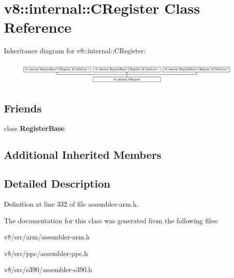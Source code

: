 \hypertarget{classv8_1_1internal_1_1CRegister}{}\section{v8\+:\+:internal\+:\+:C\+Register Class Reference}
\label{classv8_1_1internal_1_1CRegister}
Inheritance diagram for v8\+:\+:internal\+:\+:C\+Register\+:\begin{figure}[H]
\begin{center}
\leavevmode
\includegraphics[height=1.181435cm]{classv8_1_1internal_1_1CRegister}
\end{center}
\end{figure}
\subsection*{Friends}
\begin{DoxyCompactItemize}
\item 
\mbox{\label{classv8_1_1internal_1_1CRegister_a960d84c54d6f69c7f2d3cf54e7fd6938}} 
class {\bfseries Register\+Base}
\end{DoxyCompactItemize}
\subsection*{Additional Inherited Members}


\subsection{Detailed Description}


Definition at line 332 of file assembler-\/arm.\+h.



The documentation for this class was generated from the following files\+:\begin{DoxyCompactItemize}
\item 
v8/src/arm/assembler-\/arm.\+h\item 
v8/src/ppc/assembler-\/ppc.\+h\item 
v8/src/s390/assembler-\/s390.\+h\end{DoxyCompactItemize}
